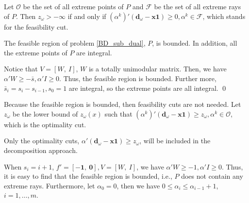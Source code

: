 Let $\mathcal{O}$ be the set of all extreme points of $P$ and $\mathcal{F}$ be the set of all extreme rays of $P$. Then $z_{\omega} > -\infty$ if and only if $(\alpha^{k}){'}(\mathbf{d}_{\omega}- \mathbf{x} \mathbf{1}) \geq 0, \alpha^{k} \in \mathcal{F}$, which stands for the feasibility cut. 

\begin{lem}\label{feasible_region}
  The feasible region of problem \eqref{BD_sub_dual}, $P$, is bounded. In addition, all the extreme points of $P$ are integral.
\end{lem}

\begin{pf}
Notice that $V =[W,~I]$, $W$ is a totally unimodular matrix. Then, we have $\alpha{'}W \geq -\bar{s}, \alpha{'}I \geq 0$. Thus, the feasible region is bounded.
Further more, $\bar{s}_i = s_i - s_{i-1}, s_0 =1$ are integral, so the extreme points are all integral.
\qed
\end{pf}

Because the feasible region is bounded, then feasibility cuts are not needed. Let $z_{\omega}$ be the lower bound of $z_{\omega}(x)$ such that $(\alpha^{k}){'}(\mathbf{d}_{\omega}- \mathbf{x} \mathbf{1}) \geq z_{\omega}, \alpha^k \in \mathcal{O}$, which is the optimality cut.

\begin{corollary}
  Only the optimality cuts, $\alpha{'}(\mathbf{d}_{\omega}- \mathbf{x} \mathbf{1}) \geq z_{\omega}$, will be included in the decomposition approach.
\end{corollary}


\begin{corollary}
  When $s_i = i+1$, $f{'} = [-\mathbf{1},~\mathbf{0}], V =[W,~I]$, we have $\alpha{'}W \geq -1, \alpha{'}I \geq 0$. Thus, it is easy to find that the feasible region is bounded, i.e., $P$ does not contain any extreme rays. Furthermore, let $\alpha_0 = 0$, then we have $0 \leq \alpha_i \leq \alpha_{i-1} +1$, $i = 1, \ldots, m$.

\end{corollary}

